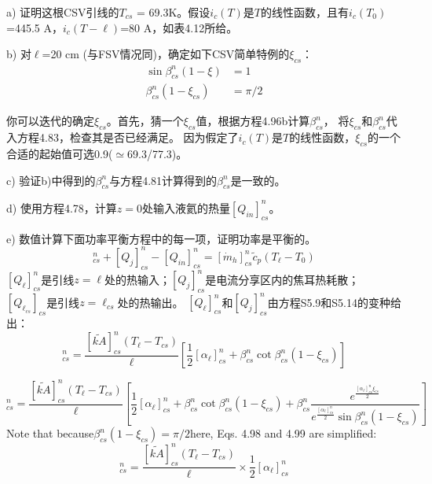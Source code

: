 a) 证明这根CSV引线的$T_{cs}$ = 69.3K。假设$i_c(T)$是$T$的线性函数，且有$i_c(T_0)$=445.5 A，$i_c(T-\ell)$=80 A，如表4.12所给。

b) 对$\ell$=20 cm (与FSV情况同)，确定如下CSV简单特例的$\xi_{cs}$：
\begin{subequations}%
	\begin{align*}
\sin\beta_{cs}^{n}(1-\xi)&=1\\
\beta_{cs}^{n}(1-\xi_{cs})&=\pi/2
	\end{align*}
\end{subequations}

你可以迭代的确定$\xi_{cs}$。首先，猜一个$\xi_{cs}$值，根据方程4.96b计算$\beta_{cs}^n$，
将$\xi_{cs}$和$\beta_{cs}^n$代入方程4.83，检查其是否已经满足。
因为假定了$i_c(T)$是$T$的线性函数，$\xi_{cs}$的一个合适的起始值可选0.9($\simeq $69.3/77.3)。

c) 验证b)中得到的$\beta_{cs}^n$与方程4.81计算得到的$\beta_{cs}^n$是一致的。 

d) 使用方程4.78，计算$z=0$处输入液氦的热量$[Q_{in}]^n_{cs}$。

e) 数值计算下面功率平衡方程中的每一项，证明功率是平衡的。
\begin{equation}%
[Q_\ell]_{cs}^{n}+[Q_j]_{cs}^{n}-[Q_{in}]_{cs}^{n}=[\dot{m}_h]_{cs}^{n}\tilde{c}_p(T_\ell-T_0)
\end{equation}
$[Q_\ell]_{cs}^{n}$是引线$z=\ell$处的热输入；$[Q_j]_{cs}^{n}$是电流分享区内的焦耳热耗散；
$[Q_{\ell_{cs}}]_{cs}$是引线$z=\ell_{cs}$处的热输出。
$[Q_\ell]_{cs}^{n}$和$[Q_j]_{cs}^{n}$由方程S5.9和S5.14的变种给出：
\begin{equation}%
[Q_\ell]_{cs}^{n}=\frac{[\tilde{kA}]_{cs}^{n}(T_\ell-T_{cs})}{\ell}[\frac{1}{2}[\alpha_\ell]_{cs}^{n}+\beta_{cs}^{n}\cot\beta_{cs}^{n}(1-\xi_{cs})]
\end{equation}

\begin{equation}%
[Q_j]_{cs}^{n}=\frac{[\tilde{kA}]_{cs}^{n}(T_\ell-T_{cs})}{\ell}\left[\frac{1}{2}[\alpha_\ell]_{cs}^{n}+\beta_{cs}^{n}\cot\beta_{cs}^{n}(1-\xi_{cs}) 
+\beta_{cs}^{n}\frac{e^{\frac{[\alpha_\ell]_{cs}^{n}\xi_{cs}}{2}}}{e^{\frac{[\alpha_\ell]_{cs}^{n}}{2}}\sin\beta_{cs}^{n}(1-\xi_{cs})}\right]
\end{equation}
Note that because$\beta_{cs}^n (1-\xi_{cs})=\pi/2$here, Eqs. 4.98 and 4.99 are simplified:
\begin{equation}%
[Q_\ell]_{cs}^{n}=\frac{[\tilde{kA}]_{cs}^{n}(T_\ell-T_{cs})}{\ell}\times\frac{1}{2}[\alpha_\ell]_{cs}^{n}
\end{equation}

